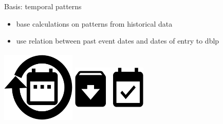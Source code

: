 \documentclass[xcolor={svgnames}]{beamer}
\makeatletter
\newcommand*{\currentname}{\@currentlabelname}
\makeatother
\begin{document}
\begin{frame}{\currentname}\linespread{1.5}
    Basis: temporal patterns
    \begin{itemize}
        \item base calculations on patterns from historical data
        \item use relation between past event dates and dates of entry to dblp
    \end{itemize}
    \includegraphics[width=100pt,height=100pt,keepaspectratio]{img/temporal_pattern.eps}%
    \includegraphics[width=100pt,height=100pt,keepaspectratio]{img/entry_date.eps}%
\end{frame}

%
%
%
%
%
%
%
\end{document}

